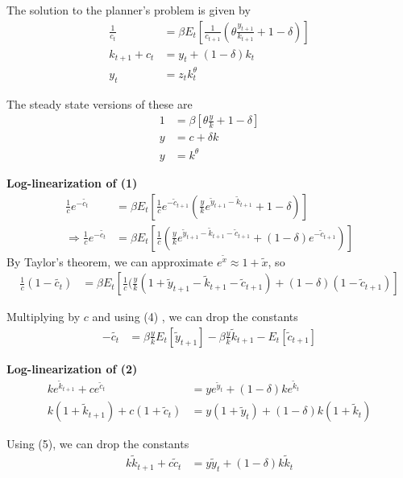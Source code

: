 \documentclass[11pt]{article}
\begin{document}
    The solution to the planner's problem is given by \begin{align}
    \frac{1}{c_t} &= \beta E_t \left[ \frac{1}{c_{t+1}} (\theta \frac{y_{t+1}}{k_{t+1}} + 1 - \delta) \right] \tag{1}\\
    k_{t+1} + c_t &= y_t + (1 - \delta) k_t \tag{2} \\
    y_t &= z_t k_t^\theta \tag{3}
\end{align}

    The steady state versions of these are \begin{align}
    1 &= \beta \left[ \theta \frac{y}{k} + 1 - \delta \right] \tag{4} \\
    y &= c + \delta k \tag{5} \\
    y &= k^\theta \tag{6}
\end{align}

    \textbf{Log-linearization of (1)} \begin{align*}
    \frac{1}{c}e^{-\tilde{c_t}} &= \beta E_t \left[ \frac{1}{c}e^{-\tilde{c}_{t+1}} ( \frac{y}{k} e^{\tilde{y}_{t+1} - \tilde{k}_{t+1}}  + 1 - \delta) \right] \\
    \Rightarrow
    \frac{1}{c}e^{-\tilde{c_t}} &= \beta E_t \left[ \frac{1}{c}( \frac{y}{k} e^{\tilde{y}_{t+1} - \tilde{k}_{t+1}-\tilde{c}_{t+1}}  + (1 - \delta)e^{-\tilde{c}_{t+1}}) \right]
\end{align*} By Taylor's theorem, we can approximate
\(e^{\tilde{x}} \approx 1 + \tilde{x}\), so \begin{align*}
    \frac{1}{c}(1-\tilde{c_t}) &= \beta E_t \left[ \frac{1}{c} (\frac{y}{k}(1 + \tilde{y}_{t+1} - \tilde{k}_{t+1} -\tilde{c}_{t+1}) + (1 - \delta)(1-\tilde{c}_{t+1}) \right]
\end{align*}

    Multiplying by \(c\) and using (4) , we can drop the constants
\begin{align*}
    -\tilde{c_t} &= \beta \frac{y}{k}E_t[\tilde{y}_{t+1}] - \beta \frac{y}{k} \tilde{k}_{t+1} - E_t[\tilde{c}_{t+1}]
\end{align*}

    \textbf{Log-linearization of (2)} \begin{align*}
    ke^{\tilde{k}_{t+1}} + ce^{\tilde{c}_t} &= ye^{\tilde{y}_t} + (1 - \delta) ke^{\tilde{k}_t} \\
    k(1+\tilde{k}_{t+1}) + c(1+\tilde{c}_t) &= y(1+\tilde{y}_t) + (1 - \delta) k(1+\tilde{k}_t)
\end{align*}

Using (5), we can drop the constants \begin{align*}
    k\tilde{k}_{t+1} + c\tilde{c}_t &= y\tilde{y}_t + (1 - \delta) k\tilde{k}_t
\end{align*}
\end{document}
